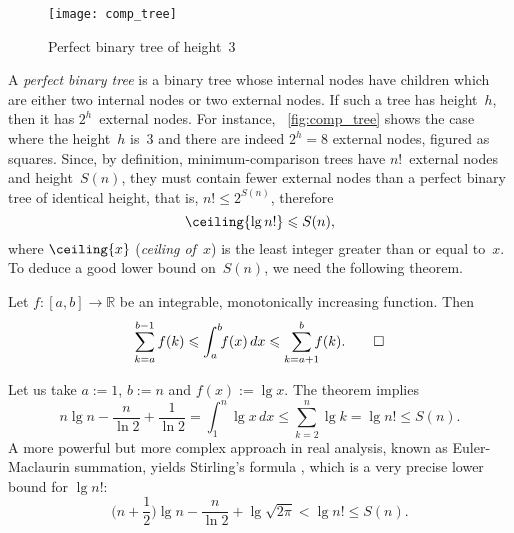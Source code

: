 %
\setlength{\intextsep}{0pt}
\begin{wrapfigure}[]{r}[0pt]{0pt}
\centering
\texttt{[image: comp\_tree]}
\caption{Perfect binary tree of height~\(3\)}
\label{fig:comp_tree}
\end{wrapfigure}
A \emph{perfect binary tree} is a
binary tree whose internal nodes have children which are either two
internal nodes or two external nodes. If such a tree has height~\(h\),
then it has \(2^h\)~external nodes. For instance,
\fig~\vref{fig:comp_tree} shows the case where the height~\(h\)
is~\(3\) and there are indeed \(2^h=8\) external nodes, figured as
squares. Since, by definition, minimum\hyp{}comparison trees have
\(n!\)~external nodes and height~\(S(n)\), they must contain fewer
external nodes than a perfect binary tree of identical height, that
is, \(n! \leqslant 2^{S(n)}\), therefore
\begin{equation*}
\ceiling{\lg n!} \leqslant S(n),
\end{equation*}
where \(\ceiling{x}\) (\textsl{ceiling of~\(x\)})
  is the least integer greater than or equal to~\(x\). To
deduce a good lower bound on~\(S(n)\), we need the following theorem.
\setlength{\intextsep}{12pt}
\begin{thm}
\label{thm:integral_bounds}
Let \(f\colon [a,b] \rightarrow \mathbb{R}\) be an integrable,
monotonically increasing function. Then
\begin{equation}
\abovedisplayskip=0pt
\sum_{k=a}^{b-1}f(k) \leqslant \int_{a}^{b}{\!\!f(x)} \,dx
                   \leqslant \sum_{k=a+1}^{b}{\!\!\!f(k)}.
\tag*{\(\Box\)}
\end{equation}
\end{thm}
\noindent Let us take \(a:=1\), \(b:=n\) and \(f(x) := \lg x\). The
theorem implies
\begin{equation*}
n\lg n - \frac{n}{\ln 2} + \frac{1}{\ln 2}
= \int_{1}^{n}{\!\!\lg x} \,dx \leqslant \sum_{k=2}^{n}{\lg k}
= \lg n! \leqslant S(n).
\end{equation*}
A more powerful but more complex approach in real analysis, known as
Euler-Maclaurin summation, yields Stirling's formula
\citep[chap.~4]{SedgewickFlajolet_1996},
which is a very precise lower bound for \(\lg n!\):
\begin{equation}
\Big(n + \frac{1}{2}\Big)\lg n - \frac{n}{\ln 2} + \lg\sqrt{2\pi}
< \lg n! \leqslant S(n).
\label{ineq:S_lower}
\end{equation}

